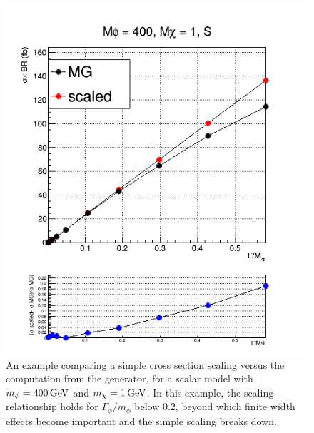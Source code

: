 \begin{figure}[!ht]
\begin{center}
\includegraphics[scale=0.45]{figures/ttbar/xVSwom_mphi_400_mchi_1_proc_S.png}
\vspace{2mm}
\caption{\label{fig:xsec_scaling} An example comparing a simple cross section scaling versus the computation from the generator, for a scalar model with $m_{\phi}=400\,{\rm GeV}$ and $m_{\chi}=1\,{\rm GeV}$. In this example, the scaling relationship holds for $\Gamma_{\phi}/m_{\phi}$ below $0.2$, beyond which finite width effects become important and the simple scaling breaks down.}
\end{center}
\end{figure}

